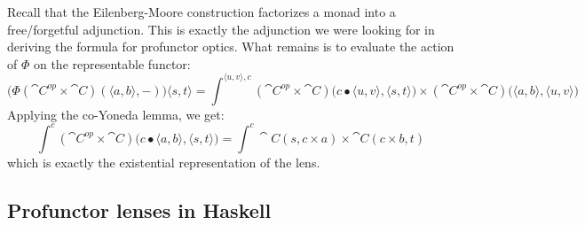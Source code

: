 \documentclass[DaoFP]{subfiles}
\begin{document}
Recall that the Eilenberg-Moore construction factorizes a monad into a free/forgetful adjunction. This is exactly the adjunction we were looking for in deriving the formula for profunctor optics. What remains is to evaluate the action of $\Phi$ on the representable functor:
\[ \big( \Phi (\cat C^{op} \times \cat C) (\langle a, b\rangle ,-) \big) \langle s, t\rangle = \int^{\langle u, v \rangle, c} (\cat C^{op} \times \cat C) \big(c \bullet \langle u, v\rangle , \langle s, t \rangle \big) \times  (\cat C^{op} \times \cat C) \big(\langle a, b\rangle , \langle u, v\rangle \big)\]
Applying the co-Yoneda lemma, we get:
\[ \int^c (\cat C^{op} \times \cat C) \big(c \bullet \langle a, b\rangle , \langle s, t \rangle\big) = \int^c \cat C(s, c \times a) \times \cat C (c \times b, t)\]
which is exactly the existential representation of the lens.

\subsection{Profunctor lenses in Haskell}

\begin{haskell}
\end{haskell}
\end{document}
